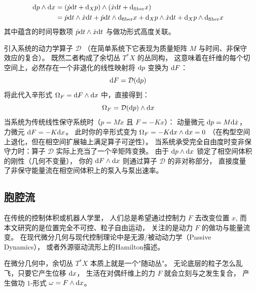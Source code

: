 ﻿\documentclass[10pt,a4paper]{article}
\numberwithin{equation}{section}
\begin{document}
\begin{equation}
    \begin{split}
      \text dp \wedge \text dx
      &= (\dot{p}\text dt + \text d_X p) \wedge (\dot{x}\text dt + \text d_{\text{fiber}}x) \\
      &= \dot{p}\text dt \wedge \dot{x}\text dt
         + \dot{p}\text dt \wedge \text d_{\text{fiber}}x
         + \text d_X p \wedge \dot{x}\text dt
         + \text d_X p \wedge \text d_{\text{fiber}}x
    \end{split}
  \end{equation}
  其中蕴含的时间导数项 $\dot{p}\text dt \wedge \dot{x}\text dt$ 与做功形式高度关联。

  引入系统的动力学算子 $\mathcal{D}$
  （在简单系统下它表现为质量矩阵 $M$ 与时间、非保守效应的复合）。
  既然二者构成了余切丛 $T^*X$ 的丛同构，
  这意味着在纤维的每个切空间上，必然存在一个非退化的线性映射将 $\text dp$ 变换为 $\text dF$：
  \begin{equation}
    \text dF = \mathcal{D}(\text dp)
  \end{equation}
  将此代入辛形式 $\Omega_F = \text dF \wedge \text dx$ 中，直接得到：
  \begin{equation}
    \Omega_F = \mathcal{D}(\text dp) \wedge \text dx
  \end{equation}
  当系统为传统线性保守系统时（$p = M\dot{x}$ 且 $F = -Kx$）：
  动量微元 $\text dp = M\text d\dot{x}$，力微元 $\text dF = -K\text dx$。
  此时你的辛形式变为 $\Omega_F = -K\text dx \wedge \text dx = 0$
  （在构型空间上退化，但在相空间扩展轴上满足算子可逆性）。
  当系统承受完全自由度时变非保守力时：算子 $\mathcal{D}$ 实际上充当了一个辛矩阵变换。
  由于 $\text dp \wedge \text dx$ 锁定了相空间体积的刚性（几何不变量），
  你的 $\text dF \wedge \text dx$ 则通过算子 $\mathcal{D}$ 的非对称部分，
  直接度量了非保守能量流在相空间体积上的泵入与泵出速率。

\subsection{胞腔流}


在传统的控制体积或机器人学里，
人们总是希望通过控制力 $F$ 去改变位置 $x$,
而本文研究的是位置完全不可控、粒子自由运动，
关注的是动力 $F$ 的做功与能量流变。
在现代微分几何与现代控制理论中是无源/被动动力学（Passive Dynamics），
或者外源驱动流形上的Hamilton描述。

在微分几何中，余切丛 $T^*X$ 本质上就是一个"随动丛"。
无论底层的粒子怎么乱飞，只要它产生位移 $\text dx$，
生活在对偶纤维上的力 $F$ 就会立刻与之发生复合，
产生做功 $1$-形式 $\omega = F \wedge \text dx$。
\end{document}
